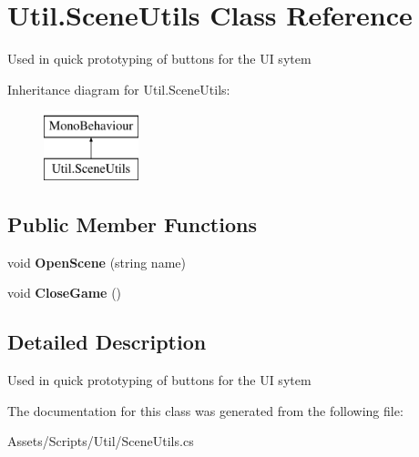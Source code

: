 \hypertarget{class_util_1_1_scene_utils}{}\section{Util.\+Scene\+Utils Class Reference}
\label{class_util_1_1_scene_utils}


Used in quick prototyping of buttons for the UI sytem  


Inheritance diagram for Util.\+Scene\+Utils\+:\begin{figure}[H]
\begin{center}
\leavevmode
\includegraphics[height=2.000000cm]{class_util_1_1_scene_utils}
\end{center}
\end{figure}
\subsection*{Public Member Functions}
\begin{DoxyCompactItemize}
\item 
void {\bfseries Open\+Scene} (string name)\hypertarget{class_util_1_1_scene_utils_af8e0c852c7dac53b86d44065e5efcdf1}{}\label{class_util_1_1_scene_utils_af8e0c852c7dac53b86d44065e5efcdf1}

\item 
void {\bfseries Close\+Game} ()\hypertarget{class_util_1_1_scene_utils_a51d4e2729e18eedf90b58c463577aa44}{}\label{class_util_1_1_scene_utils_a51d4e2729e18eedf90b58c463577aa44}

\end{DoxyCompactItemize}


\subsection{Detailed Description}
Used in quick prototyping of buttons for the UI sytem 



The documentation for this class was generated from the following file\+:\begin{DoxyCompactItemize}
\item 
Assets/\+Scripts/\+Util/Scene\+Utils.\+cs\end{DoxyCompactItemize}
